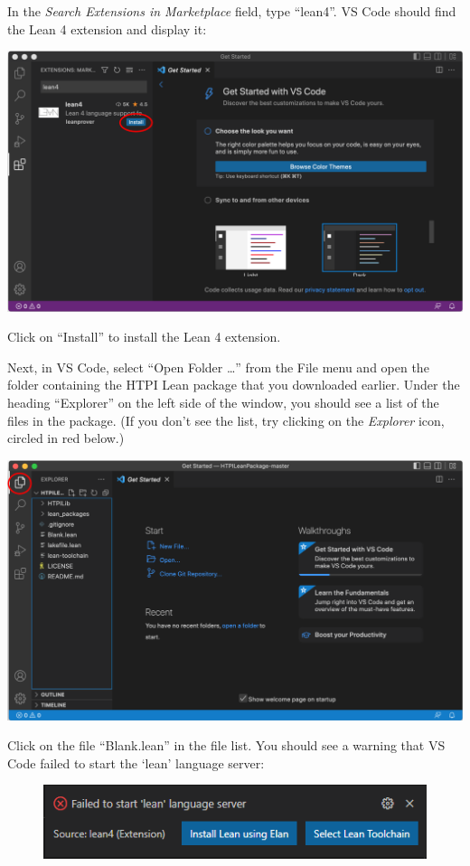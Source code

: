 \documentclass[
  letterpaper,
  DIV=11,
  numbers=noendperiod]{scrreprt}
\theoremstyle{remark}
\begin{document}
In the \emph{Search Extensions in Marketplace} field, type ``lean4''. VS
Code should find the Lean 4 extension and display it:

\includegraphics{./Images/InstallExtension.png}

Click on ``Install'' to install the Lean 4 extension.

Next, in VS Code, select ``Open Folder \ldots{}'' from the File menu and
open the folder containing the HTPI Lean package that you downloaded
earlier. Under the heading ``Explorer'' on the left side of the window,
you should see a list of the files in the package. (If you don't see the
list, try clicking on the \emph{Explorer} icon, circled in red below.)

\includegraphics{./Images/OpenPackage.png}

Click on the file ``Blank.lean'' in the file list. You should see a
warning that VS Code failed to start the `lean' language server:

\begin{figure}

{\centering \includegraphics{./Images/Install-elan.png}

}

\end{figure}
\end{document}
